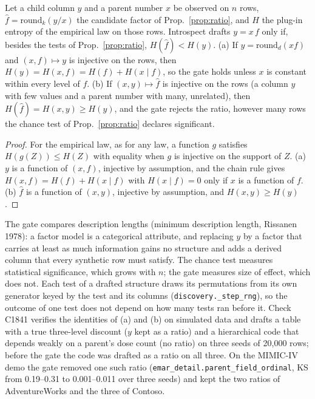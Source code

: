 \setcounter{proposition}{1840}
\begin{proposition}\label{prop:ratiogate}
Let a child column $y$ and a parent number $x$ be observed on $n$ rows, $\hat f=\mathrm{round}_k(y/x)$ the candidate factor of Prop.~\ref{prop:ratio}, and $H$ the plug-in entropy of the empirical law on those rows. Introspect drafts $y=x\,f$ only if, besides the tests of Prop.~\ref{prop:ratio}, $H(\hat f)<H(y)$. (a) If $y=\mathrm{round}_d(xf)$ and $(x,f)\mapsto y$ is injective on the rows, then $H(y)=H(x,f)=H(f)+H(x\mid f)$, so the gate holds unless $x$ is constant within every level of $f$. (b) If $(x,y)\mapsto\hat f$ is injective on the rows (a column $y$ with few values and a parent number with many, unrelated), then $H(\hat f)=H(x,y)\ge H(y)$, and the gate rejects the ratio, however many rows the chance test of Prop.~\ref{prop:ratio} declares significant.
\end{proposition}
\begin{proof}
For the empirical law, as for any law, a function $g$ satisfies $H(g(Z))\le H(Z)$ with equality when $g$ is injective on the support of $Z$. (a) $y$ is a function of $(x,f)$, injective by assumption, and the chain rule gives $H(x,f)=H(f)+H(x\mid f)$ with $H(x\mid f)=0$ only if $x$ is a function of $f$. (b) $\hat f$ is a function of $(x,y)$, injective by assumption, and $H(x,y)\ge H(y)$.
\end{proof}
\noindent The gate compares description lengths (minimum description length, Rissanen 1978): a factor model is a categorical attribute, and replacing $y$ by a factor that carries at least as much information gains no structure and adds a derived column that every synthetic row must satisfy. The chance test measures statistical significance, which grows with $n$; the gate measures size of effect, which does not. Each test of a drafted structure draws its permutations from its own generator keyed by the test and its columns (\texttt{discovery.\_step\_rng}), so the outcome of one test does not depend on how many tests ran before it. Check C1841 verifies the identities of (a) and (b) on simulated data and drafts a table with a true three-level discount ($y$ kept as a ratio) and a hierarchical code that depends weakly on a parent's dose count (no ratio) on three seeds of 20{,}000 rows; before the gate the code was drafted as a ratio on all three. On the MIMIC-IV demo the gate removed one such ratio (\texttt{emar\_detail.parent\_field\_ordinal}, KS from 0.19--0.31 to 0.001--0.011 over three seeds) and kept the two ratios of AdventureWorks and the three of Contoso.

